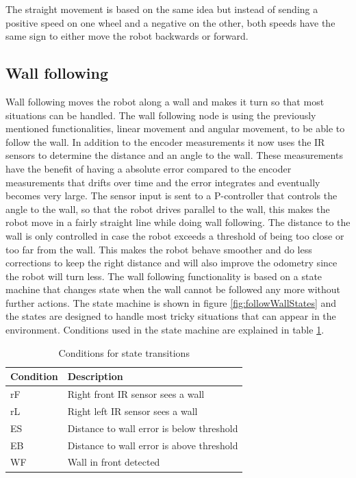 The straight movement is based on the same idea but instead of sending a positive speed on one wheel and a negative on the other, both speeds have the same sign to either move the robot backwards or forward. 

\subsection{Wall following}
\label{subsec:wallFollowing}

Wall following moves the robot along a wall and makes it turn so that most situations can be handled. The wall following node is using the previously mentioned functionalities, linear movement and angular movement, to be able to follow the wall. In addition to the encoder measurements it now uses the IR sensors to determine the distance and an angle to the wall. These measurements have the benefit of having a absolute error compared to the encoder measurements that drifts over time and the error integrates and eventually becomes very large.
	The sensor input is sent to a P-controller that controls the angle to the wall, so that the robot drives parallel to the wall, this makes the robot move in a fairly straight line while doing wall following. The distance to the wall is only controlled in case the robot exceeds a threshold of being too close or too far from the wall. This makes the robot behave smoother and do less corrections to keep the right distance and will also improve the odometry since the robot will turn less.
	The wall following functionality is based on a state machine that changes state when the wall cannot be followed any more without further actions. The state machine is shown in figure  \ref{fig:followWallStates} and the states are designed to handle most tricky situations that can appear in the environment. Conditions used in the state machine are explained in table \ref{tab:conditions}.

\begin{table}[h!]
\caption{Conditions for state transitions}
\centering
  \begin{tabular}{l|l}
    \textbf{Condition} & \textbf{Description} \\ \hline
    rF & Right front IR sensor sees a wall \\ \hline
    rL & Right left IR sensor sees a wall \\ \hline
    ES & Distance to wall error is below threshold \\ \hline
    EB & Distance to wall error is above threshold \\ \hline
    WF & Wall in front detected \\
  \end{tabular}
  \label{tab:conditions}
\normalsize
\end{table}


